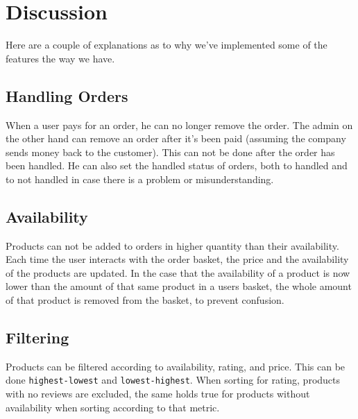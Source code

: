 \section{Discussion}\label{sec:discussion}

Here are a couple of explanations as to why we've implemented some of the
features the way we have.

\subsection{Handling Orders}

When a user pays for an order, he can no longer remove the order. The admin
on the other hand can remove an order after it's been paid (assuming the
company sends money back to the customer). This can not be done after the
order has been handled. He can also set the handled status of orders, both
to handled and to not handled in case there is a problem or misunderstanding.

\subsection{Availability}

Products can not be added to orders in higher quantity than their availability.
Each time the user interacts with the order basket, the price and the
availability of the products are updated. In the case that the availability
of a product is now lower than the amount of that same product in a users
basket, the whole amount of that product is removed from the basket, to
prevent confusion.

\subsection{Filtering}

Products can be filtered according to availability, rating,
and price. This can be done \texttt{highest-lowest} and
\texttt{lowest-highest}. When sorting for rating, products with no
reviews are excluded, the same holds true for products without availability
when sorting according to that metric.
